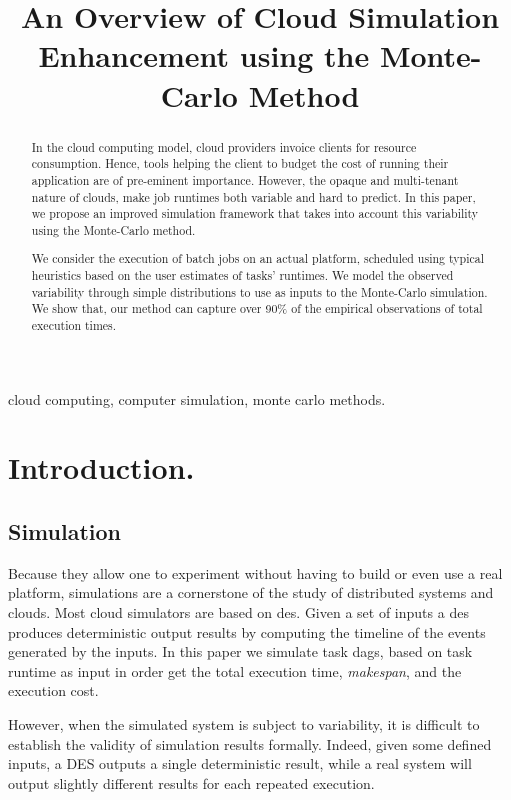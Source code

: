 \documentclass[10pt,conference,compsocconf]{IEEEtran}
\title{An Overview of Cloud Simulation Enhancement using the Monte-Carlo Method}
\author{\IEEEauthorblockN{Luke~Bertot 
			and Stéphane~Genaud 
			and Julien~Gossa}
	\IEEEauthorblockA{Icube-ICPS --- UMR 7357, Univeristé de Strasbourg, CNRS\\
		P\^ole API Blvd S. Bant, 67400 Illkirch-Graffenstaden\\
		email: \url{lbertot@unistra.fr}, \url{genaud@unistra.fr}, \url{gossa@unistra.fr}}
	}
\begin{document}
\maketitle

\begin{abstract}
  In the  cloud computing  model, cloud providers  invoice clients  for resource
  consumption. Hence, tools helping the client to budget the cost of running
  their application are  of pre-eminent  importance. However, the opaque and
  multi-tenant nature of clouds, make job runtimes both variable and hard to
  predict.  In this  paper, we  propose an improved simulation framework that
  takes into account  this variability using the Monte-Carlo method.

  We consider  the execution of batch jobs on  an actual platform, scheduled
  using typical  heuristics based  on the  user estimates  of tasks' runtimes. We
  model  the observed  variability through  simple  distributions to use  as
  inputs  to the  Monte-Carlo  simulation. We show that, our method can capture 
  over  90\% of the empirical observations of total execution times.
\end{abstract}

\begin{IEEEkeywords}
cloud computing, computer simulation, monte carlo methods.
\end{IEEEkeywords}


\section{Introduction.}

\subsection{Simulation}

Because they allow one to experiment without having to build or even use a real 
platform, simulations are a cornerstone of the study of distributed
systems and clouds.  
Most cloud simulators  are based on \ac{des}. Given a set of inputs a \ac{des}
produces deterministic output results by computing the timeline of the events
generated by the inputs.  In this paper
we simulate task \acp{dag}, based on task runtime as input in order get the total
execution time, \emph{makespan}, and the execution cost.

However, when the simulated system is subject to variability, it is difficult
to establish  the  validity of  simulation  results formally. Indeed, given some
defined inputs, a DES outputs a single deterministic result, while a real system
will output  slightly different results for each repeated execution.
\end{document}
